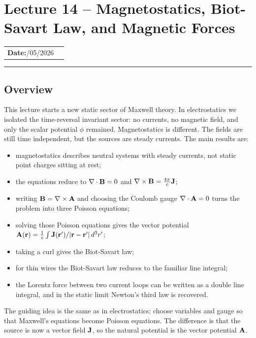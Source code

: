 \section{Lecture 14 -- Magnetostatics, Biot-Savart Law, and Magnetic Forces}\label{sec:lec14}

\begin{center}
\begin{tabular}{ll}
  \textbf{Date:}\quad 24/05/2026 & \\
\end{tabular}
\end{center}
\hrule\vspace{1.5em}

\subsection*{Overview}

This lecture starts a new static sector of Maxwell theory.  In electrostatics we
isolated the time-reversal invariant sector: no currents, no magnetic field, and
only the scalar potential $\phi$ remained.  Magnetostatics is different.  The fields
are still time independent, but the sources are steady currents.  The main results are:
\begin{itemize}
  \item magnetostatics describes neutral systems with steady currents, not static
        point charges sitting at rest;
  \item the equations reduce to
        $\nabla \cdot\mathbf{B}=0$ and $\nabla\times\mathbf{B} = \frac{4\pi}{c}\mathbf{J}$;
  \item writing $\mathbf{B}=\nabla\times\mathbf{A}$ and choosing the Coulomb gauge
        $\nabla \cdot\mathbf{A}=0$ turns the problem into three Poisson equations;
  \item solving those Poisson equations gives the vector potential
        $\mathbf{A}(\mathbf{r})=\frac{1}{c}\int \mathbf{J}(\mathbf{r}')/|\mathbf{r}-\mathbf{r}'|\,d^3r'$;
  \item taking a curl gives the Biot-Savart law;
  \item for thin wires the Biot-Savart law reduces to the familiar line integral;
  \item the Lorentz force between two current loops can be written as a double line
        integral, and in the static limit Newton's third law is recovered.
\end{itemize}

The guiding idea is the same as in electrostatics: choose variables and gauge so that
Maxwell's equations become Poisson equations.  The difference is that the source is
now a vector field $\mathbf{J}$, so the natural potential is the vector potential $\mathbf{A}$.

